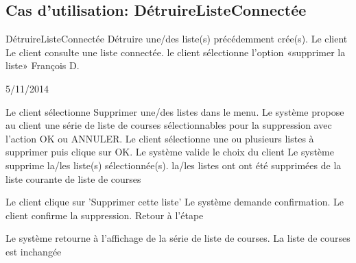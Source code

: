 \subsection{Cas d'utilisation: DétruireListeConnectée}

\startCU
\nom DétruireListeConnectée
\but Détruire une/des liste(s) précédemment crée(s).
\acteur Le client
\precondition Le client consulte une liste connectée.
\declenchement le client sélectionne l'option «supprimer la liste»
\auteur François D.
\date 05/11/2014

\nominal %
\startnominal
{} Le client sélectionne Supprimer une/des listes dans le menu.
\etape Le système propose au client une série de liste de courses sélectionnables pour la suppression avec l'action OK ou ANNULER.
 Le client sélectionne une ou plusieurs listes à supprimer puis clique sur OK.
 Le système valide le choix du client
 Le système supprime la/les liste(s) sélectionnée(s).
\stopnominal
\postcondition la/les listes ont ont été supprimées de la liste courante de liste de courses

\alternatifs 
{} 
  \etape Le client clique sur 'Supprimer cette liste'
  \etape Le système demande confirmation.
  \etape Le client confirme la suppression.
  \etape Retour à l'étape 
\stopcondition
\stopalternatif

\exception 
{} 
  \etape Le système retourne à l'affichage de la série de liste de courses.
\stopcondition
\postcondition La liste de courses est inchangée
\stopalternatif
\stopCU
